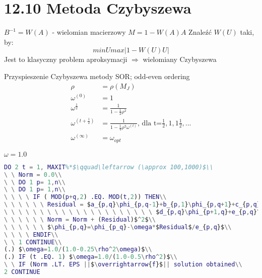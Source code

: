 \section{12.10 Metoda Czybyszewa}

\begin{frame}{}
  $B^{-1}=W(A)$ - wielomian macierzowy $M=1-W(A)A$ Znaleźć $W(U)$ taki, by:
  $$minUmax|1-W(U)U|$$
  Jest to klasyczny problem aproksymacji $\Rightarrow$ wielomiany Czybyszewa
\end{frame}

\begin{frame}
  \begin{block}{Przyspieszenie Czybyszewa metody SOR; odd-even ordering}
    \begin{align*}
    \rho &= \rho(M_J)\\
    \omega^{(0)}&=1\\
    \omega^{\frac{1}{2}}&=\frac{1}{1-\frac{1}{2}\rho^2}\\
    \omega^{(t+\frac{1}{2})}&=\frac{1}{1-\frac{1}{4}\rho^2\omega^{(t)}}\text{, dla t=}\frac{1}{2},1,1\frac{1}{2},...\\
    \omega^{(\infty)} &= \omega_{opt}
    \end{align*}
  \end{block}
\end{frame}

\begin{frame}[fragile]{}
 $\omega=1.0$
\begin{lstlisting}[language=Matlab]
DO 2 t = 1, MAXIT%*$\qquad\leftarrow (\approx 100,1000)$\\
\ \ Norm = 0.0\\
\ \ DO 1 p= 1,n\\
\ \ DO 1 p= 1,n\\
\ \ \ \ IF ( MOD(p+q,2) .EQ. MOD(t,2)) THEN\\
\ \ \ \ \ \ Residual = $a_{p,q}\phi_{p,q-1}+b_{p,1}\phi_{p,q+1}+c_{p,q}\phi_{p-1,q}+$\\
\ \ \ \ \ \ \ \ \ \ \ \ \ \ \ \ \ \ \ \ \ $d_{p,q}\phi_{p+1,q}+e_{p,q}\phi_{p,q}-f_{p,q}$\\
\ \ \ \ \ \ Norm = Norm + (Residual)$^2$\\
\ \ \ \ \ \ $\phi_{p,q}=\phi_{p_q}-\omega*$Residual$/e_{p,q}$\\
\ \ \ \ ENDIF\\
\ \ 1 CONTINUE\\
(.) $\omega=1.0/(1.0-0.25\rho^2\omega)$\\
(.) IF (t .EQ. 1) $\omega=1.0/(1.0-0.5\rho^2)$\\
\ \ IF (Norm .LT. EPS ||$\overrightarrow{f}$|| solution obtained\\
2 CONTINUE
\end{lstlisting}
\end{frame}

